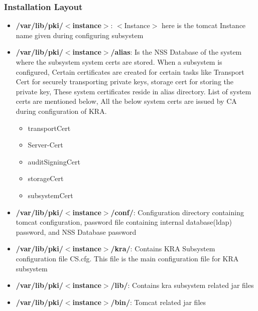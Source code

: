 \documentclass[a4paper]{article}
\begin{document}
\subsubsection{Installation Layout}
\begin{itemize}
    \item \textbf{/var/lib/pki/$<$instance$>$}: $<$Instance$>$ here is the tomcat Instance name 
        given during configuring subsystem
    \item \textbf{/var/lib/pki/$<$instance$>$/alias}: Is the NSS Database of the system where the subsystem system 
        certs are stored. When a subsystem is configured, Certain certificates are created for certain tasks 
        like Transport Cert for securely transporting private keys, storage cert for storing the private key, 
        These system certificates reside in alias directory. List of system certs are mentioned below, 
        All the below system certs are issued by CA during configuration of KRA.
        \begin{itemize}
            \item transportCert
            \item Server-Cert
            \item auditSigningCert
            \item storageCert
            \item subsystemCert
        \end{itemize}
    \item \textbf{/var/lib/pki/$<$instance$>$/conf/}: Configuration directory containing tomcat configuration,
        password file containing internal database(ldap) password, and NSS Database password
    \item \textbf{/var/lib/pki/$<$instance$>$/kra/}: Contains KRA Subsystem configuration file CS.cfg. This file is
        the main configuration file for KRA subsystem
    \item \textbf{/var/lib/pki/$<$instance$>$/lib/}: Contains kra subsystem related jar files 
    \item \textbf{/var/lib/pki/$<$instance$>$/bin/}: Tomcat related jar files
\end{itemize}
\end{document}
